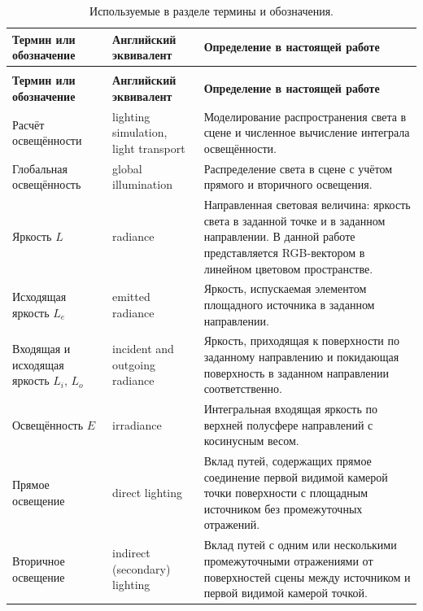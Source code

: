 {\small\renewcommand{\arraystretch}{1.18}
\begin{xltabular}{\textwidth}{>{\raggedright\arraybackslash}p{0.23\textwidth} >{\raggedright\arraybackslash}p{0.19\textwidth} >{\raggedright\arraybackslash}X}
\caption{Используемые в разделе термины и обозначения.}\label{tab:method-terms}\\
\toprule
\textbf{Термин или обозначение} & \textbf{Английский эквивалент} & \textbf{Определение в настоящей работе} \\
\midrule
\endfirsthead
{}\\
\toprule
\textbf{Термин или обозначение} & \textbf{Английский эквивалент} & \textbf{Определение в настоящей работе} \\
\midrule
\endhead
\bottomrule
\endlastfoot
Расчёт освещённости & lighting simulation, light transport & Моделирование распространения света в сцене и численное вычисление интеграла освещённости. \\

Глобальная освещённость & global illumination & Распределение света в сцене с учётом прямого и вторичного освещения. \\

Яркость $L$ & radiance & Направленная световая величина: яркость света в заданной точке и в заданном направлении. В данной работе представляется RGB-вектором в линейном цветовом пространстве. \\

Исходящая яркость $L_e$ & emitted radiance & Яркость, испускаемая элементом площадного источника в заданном направлении. \\

Входящая и исходящая яркость $L_i$, $L_o$ & incident and outgoing radiance & Яркость, приходящая к поверхности по заданному направлению и покидающая поверхность в заданном направлении соответственно. \\

Освещённость $E$ & irradiance & Интегральная входящая яркость по верхней полусфере направлений с косинусным весом. \\

Прямое освещение & direct lighting & Вклад путей, содержащих прямое соединение первой видимой камерой точки поверхности с площадным источником без промежуточных отражений. \\

Вторичное освещение & indirect (secondary) lighting & Вклад путей с одним или несколькими промежуточными отражениями от поверхностей сцены между источником и первой видимой камерой точкой. \\


\end{xltabular}}
